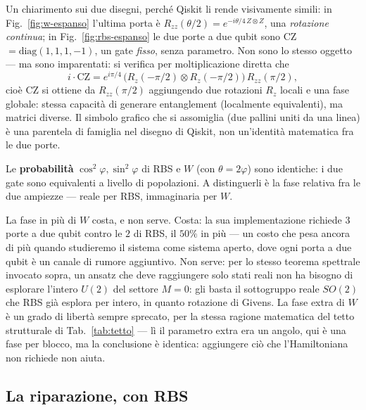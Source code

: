 \documentclass[11pt,a4paper]{article}
\begin{document}
Un chiarimento sui due disegni, perché Qiskit li rende visivamente simili: in
Fig.~\ref{fig:w-espanso} l'ultima porta è $R_{zz}(\theta/2)=e^{-i\theta/4\,Z
\otimes Z}$, una \emph{rotazione continua}; in Fig.~\ref{fig:rbs-espanso} le
due porte a due qubit sono CZ$=\mathrm{diag}(1,1,1,-1)$, un gate \emph{fisso},
senza parametro. Non sono lo stesso oggetto --- ma sono imparentati: si
verifica per moltiplicazione diretta che
\begin{equation}
i\cdot\mathrm{CZ} = e^{i\pi/4}\,\big(R_z(-\pi/2)\otimes R_z(-\pi/2)\big)\,R_{zz}(\pi/2),
\end{equation}
cioè CZ si ottiene da $R_{zz}(\pi/2)$ aggiungendo due rotazioni $R_z$ locali e
una fase globale: stessa capacità di generare entanglement (localmente
equivalenti), ma matrici diverse. Il simbolo grafico che si assomiglia (due
pallini uniti da una linea) è una parentela di famiglia nel disegno di
Qiskit, non un'identità matematica fra le due porte.

Le \textbf{probabilità} $\cos^2\varphi,\sin^2\varphi$ di RBS e $W$ (con
$\theta=2\varphi$) sono identiche: i due gate sono equivalenti a livello di
popolazioni. A distinguerli è la fase relativa fra le due ampiezze --- reale
per RBS, immaginaria per $W$.

La fase in più di $W$ costa, e non serve. Costa: la sua implementazione
richiede $3$ porte a due qubit contro le $2$ di RBS, il $50\%$ in più --- un
costo che pesa ancora di più quando studieremo il sistema come sistema
aperto, dove ogni porta a due qubit è un canale di rumore aggiuntivo. Non serve: per lo stesso teorema spettrale
invocato sopra, un ansatz che deve raggiungere solo stati reali non ha bisogno
di esplorare l'intero $U(2)$ del settore $M=0$: gli basta il sottogruppo
reale $SO(2)$ che RBS già esplora per intero, in quanto rotazione di Givens.
La fase extra di $W$ è un grado di libertà sempre sprecato, per la stessa
ragione matematica del tetto strutturale di Tab.~\ref{tab:tetto} --- lì il
parametro extra era un angolo, qui è una fase per blocco, ma la conclusione è
identica: aggiungere ciò che l'Hamiltoniana non richiede non aiuta.


\subsection*{La riparazione, con RBS}
\end{document}
